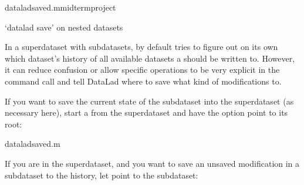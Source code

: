 \begin{sphinxVerbatim}[commandchars=\\\{\}]
dataladsave\PYGZhy{}d.\PYGZhy{}mmidterm\PYGZus{}project
\end{sphinxVerbatim}

\ignorespaces \begin{findoutmore}[label={fom-save-subds}, before title={\thetcbcounter\ }, float, floatplacement=tb, check odd page=true]{‘datalad save’ on nested datasets}
\label{\detokenize{basics/101-132-advancednesting:fom-save-subds}}

\sphinxAtStartPar
In a superdataset with subdatasets,  by default
tries to figure out on its own which dataset’s history of all available
datasets a  should be written to. However, it can reduce
confusion or allow specific operations to be very explicit in the command
call and tell DataLad where to save what kind of modifications to.

\sphinxAtStartPar
If you want to save the current state of the subdataset into the superdataset
(as necessary here), start a  from the superdataset and have the
 option point to its root:

\begin{sphinxVerbatim}[commandchars=\\\{\}]
dataladsave\PYGZhy{}d.\PYGZhy{}m
\end{sphinxVerbatim}

\sphinxAtStartPar
If you are in the superdataset, and you want to save an unsaved modification
in a subdataset to the  history, let  point to
the subdataset:


\end{findoutmore}
